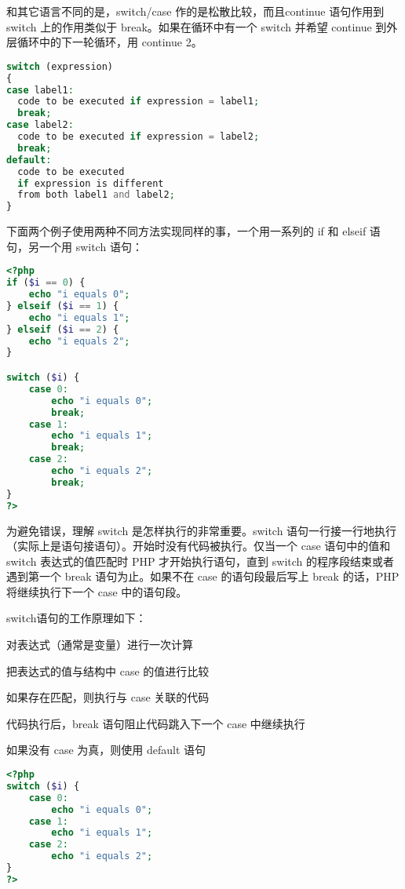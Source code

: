 和其它语言不同的是，switch/case 作的是松散比较，而且continue 语句作用到 switch 上的作用类似于 break。如果在循环中有一个 switch 并希望 continue 到外层循环中的下一轮循环，用 continue 2。

\begin{lstlisting}[language=PHP]
switch (expression)
{
case label1:
  code to be executed if expression = label1;
  break;  
case label2:
  code to be executed if expression = label2;
  break;
default:
  code to be executed
  if expression is different 
  from both label1 and label2;
}
\end{lstlisting}

下面两个例子使用两种不同方法实现同样的事，一个用一系列的 if 和 elseif 语句，另一个用 switch 语句：

\begin{lstlisting}[language=PHP]
<?php
if ($i == 0) {
    echo "i equals 0";
} elseif ($i == 1) {
    echo "i equals 1";
} elseif ($i == 2) {
    echo "i equals 2";
}

switch ($i) {
    case 0:
        echo "i equals 0";
        break;
    case 1:
        echo "i equals 1";
        break;
    case 2:
        echo "i equals 2";
        break;
}
?>
\end{lstlisting}

为避免错误，理解 switch 是怎样执行的非常重要。switch 语句一行接一行地执行（实际上是语句接语句）。开始时没有代码被执行。仅当一个 case 语句中的值和 switch 表达式的值匹配时 PHP 才开始执行语句，直到 switch 的程序段结束或者遇到第一个 break 语句为止。如果不在 case 的语句段最后写上 break 的话，PHP 将继续执行下一个 case 中的语句段。


switch语句的工作原理如下：

\begin{compactenum}
\item 对表达式（通常是变量）进行一次计算
\item 把表达式的值与结构中 case 的值进行比较
\item 如果存在匹配，则执行与 case 关联的代码
\item 代码执行后，break 语句阻止代码跳入下一个 case 中继续执行
\item 如果没有 case 为真，则使用 default 语句
\end{compactenum}




\begin{lstlisting}[language=PHP]
<?php
switch ($i) {
    case 0:
        echo "i equals 0";
    case 1:
        echo "i equals 1";
    case 2:
        echo "i equals 2";
}
?>
\end{lstlisting}


